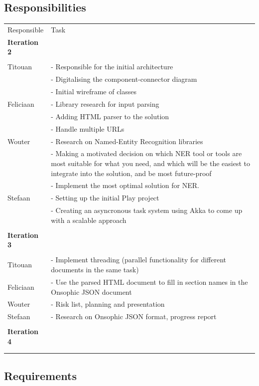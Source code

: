 \documentclass[a4paper,12pt]{article}
\newcommand{\headcol}{\rowcolor{tableheadcolor}} %
\newcommand{\rowcol}{\rowcolor{tablerowcolor}} %
\newcommand{\topline}{\arrayrulecolor{black}\specialrule{0.1em}{\abovetopsep}{0pt}%
            \arrayrulecolor{tableheadcolor}\specialrule{\belowrulesep}{0pt}{0pt}%
            \arrayrulecolor{black}}
\newcommand{\midline}{\arrayrulecolor{tableheadcolor}\specialrule{\aboverulesep}{0pt}{0pt}%
            \arrayrulecolor{black}\specialrule{\lightrulewidth}{0pt}{0pt}%
            \arrayrulecolor{white}\specialrule{\belowrulesep}{0pt}{0pt}%
            \arrayrulecolor{black}}
\newcommand{\bottomlinec}{\arrayrulecolor{tablerowcolor}\specialrule{\aboverulesep}{0pt}{0pt}%
            \arrayrulecolor{black}\specialrule{\heavyrulewidth}{0pt}{\belowbottomsep}}%
\begin{document}
\subsection{Responsibilities}
\begin{tabular}{lp{12cm}}
  \topline
  \headcol Responsible & Task  \\
  \midline
\textbf{Iteration 2} \\\\
 \rowcol Titouan & - Responsible for the initial architecture\\
 \rowcol & - Digitalising the component-connector diagram \\
 \rowcol & - Initial wireframe of classes \\
 Feliciaan & - Library research for input parsing\\ 
 & - Adding HTML parser to the solution \\
 & - Handle multiple URLs \\
 \rowcol Wouter & - Research on Named-Entity Recognition libraries\\ 
\rowcol  & - Making a motivated decision on which NER tool or tools are most suitable for what you need, and which will be the easiest to integrate into the solution, and be most future-proof \\
\rowcol & - Implement the most optimal solution for NER.\\ 
Stefaan & - Setting up the initial Play project\\ 
 & - Creating an asyncronous task system using Akka to come up with a scalable approach \\
 & \\\hline
\textbf{Iteration 3} \\\\
 \rowcol Titouan & - Implement threading (parallel functionality for different documents in the same task)\\
 Feliciaan & - Use the parsed HTML document to fill in section names in the Onsophic JSON document\\
 \rowcol Wouter & - Risk list, planning and presentation\\ 
Stefaan & - Research on Onsophic JSON format, progress report\\
 & \\\hline
\textbf{Iteration 4} \\\\
  \bottomlinec
\end{tabular}
\subsection{Requirements}
\end{document}
